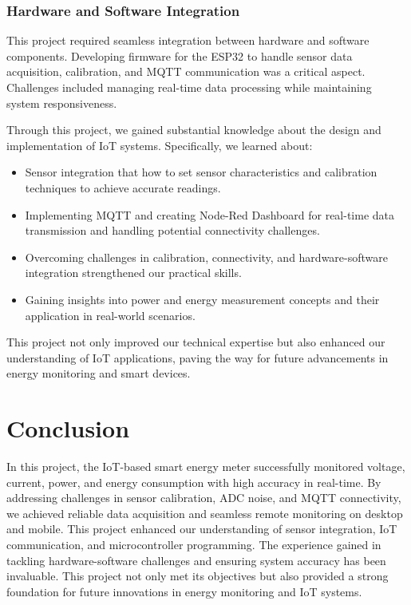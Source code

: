 \documentclass[a4paper,12pt]{report}
\begin{document}
\subsubsection{Hardware and Software Integration}
This project required seamless integration between hardware and software components. Developing firmware for the ESP32 to handle sensor data acquisition, calibration, and MQTT communication was a critical aspect. Challenges included managing real-time data processing while maintaining system responsiveness.
\vspace{5mm}

Through this project, we gained substantial knowledge about the design and implementation of IoT systems. Specifically, we learned about:
\begin{itemize}
    \item Sensor integration that how to set sensor characteristics and calibration techniques to achieve accurate readings.
    \item Implementing MQTT and creating Node-Red Dashboard for real-time data transmission and handling potential connectivity challenges.
    \item  Overcoming challenges in calibration, connectivity, and hardware-software integration strengthened our practical skills.
    \item Gaining insights into power and energy measurement concepts and their application in real-world scenarios.
\end{itemize} 

This project not only improved our technical expertise but also enhanced our understanding of IoT applications, paving the way for future advancements in energy monitoring and smart devices.

\section{Conclusion}
   In this project,  the IoT-based smart energy meter successfully monitored voltage, current, power, and energy consumption with high accuracy in real-time. By addressing challenges in sensor calibration, ADC noise, and MQTT connectivity, we achieved reliable data acquisition and seamless remote monitoring on desktop and mobile. This project enhanced our understanding of sensor integration, IoT communication, and microcontroller programming. The experience gained in tackling hardware-software challenges and ensuring system accuracy has been invaluable. This project not only met its objectives but also provided a strong foundation for future innovations in energy monitoring and IoT systems.
\end{document}
